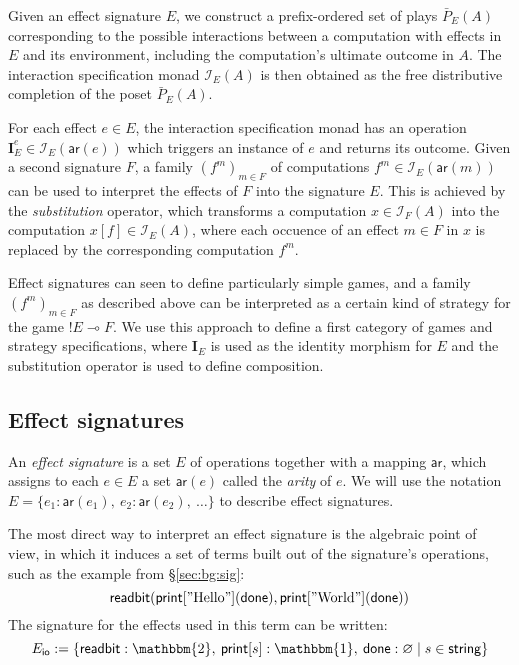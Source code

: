 \documentclass[sigplan,10pt,review,anonymous]{acmart}
\newcommand{\kw}[1]{\ensuremath{ \mathsf{#1} }}
\begin{document}
Given an effect signature $E$,
we construct a prefix-ordered set of plays $\bar{P}_E(A)$
corresponding to the possible interactions between
a computation with effects in $E$
and its environment,
including the computation's ultimate outcome in $A$.
The interaction specification monad $\mathcal{I}_E(A)$ is then obtained
as the free distributive completion of the poset $\bar{P}_E(A)$.

For each effect $e \in E$,
the interaction specification monad
has an operation
$\mathbf{I}_E^e \in \mathcal{I}_E(\kw{ar}(e))$
which triggers an instance of $e$ and returns its outcome.
Given a second signature $F$,
a family $(f^m)_{m \in F}$ of computations
$f^m \in \mathcal{I}_E(\kw{ar}(m))$
can be used to interpret the effects of $F$
into the signature $E$.
This is achieved by the \emph{substitution} operator,
which transforms a computation $x \in \mathcal{I}_F(A)$
into the computation $x[f] \in \mathcal{I}_E(A)$,
where each occuence of an effect $m \in F$ in $x$
is replaced by the corresponding computation $f^m$.

Effect signatures can seen to define
particularly simple games,
and a family $(f^m)_{m \in F}$ as described above
can be interpreted as
a certain kind of strategy for the game ${!E} \multimap F$.
We use this approach to define
a first category of games and strategy specifications,
where $\mathbf{I}_E$ is used as
the identity morphism for $E$ and
the substitution operator is used to define composition.


\subsection{Effect signatures} %

\begin{definition}
An \emph{effect signature}
is a set $E$ of operations
together with a mapping $\kw{ar}$,
which assigns to each $e \in E$ a set $\kw{ar}(e)$
called the \emph{arity} of $e$.
We will use the notation
$E = \{ e_1 : \kw{ar}(e_1), \: e_2 : \kw{ar}(e_2), \: \ldots \}$
to describe effect signatures.
\end{definition}

The most direct way to interpret an effect signature
is the algebraic point of view,
in which it induces a set of terms
built out of the signature's operations,
such as the example from \S\ref{sec:bg:sig}:
\[
    \kw{readbit}(
      \kw{print}["\text{Hello}"](\kw{done}),
      \kw{print}["\text{World}"](\kw{done}))
\]
The signature for the effects used in this term
can be written:
\[
  E_\kw{io} :=
  \{ \kw{readbit} : \mathbbm{2}, \:
     \kw{print}[s] : \mathbbm{1}, \:
     \kw{done} : \varnothing \mid
     s \in \kw{string} \}
\]
\end{document}
